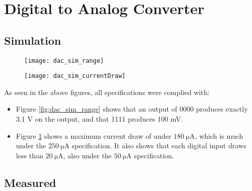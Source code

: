 \graphicspath{{content/3_results/figures}}
\section{Digital to Analog Converter}

\subsection{Simulation}

\begin{figure}[!htb]
    \centering
    \begin{minipage}{.5\textwidth}
        \centering
        \texttt{[image: dac\_sim\_range]}
        \label{fig:dac_sim_range}
    \end{minipage}
    \begin{minipage}{.45\textwidth}
        \centering
        \texttt{[image: dac\_sim\_currentDraw]}
        \label{fig:dac_sim_currentDraw}
    \end{minipage}
\end{figure}

As seen in the above figures, all specifications were complied with:
\begin{itemize}
    \item Figure \ref{fig:dac_sim_range} shows that an output of 0000 produces exactly 3.1 V on the output, and that 1111 produces 100 mV.
    \item Figure \ref{fig:dac_sim_currentDraw} shows a maximum current draw of under $\SI{180}{\micro\ampere}$, which is much under the $\SI{250}{\micro\ampere}$ specification.
          It also shows that each digital input draws less than $\SI{20}{\micro\ampere}$, also under the $\SI{50}{\micro\ampere}$ specification.
\end{itemize}

\subsection{Measured}


